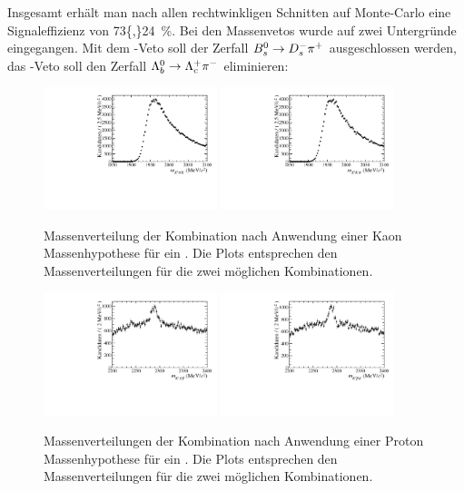 Insgesamt erhält man nach allen rechtwinkligen Schnitten auf Monte-Carlo eine Signaleffizienz von \SI{73{,}24}{\%}. Bei den Massenvetos wurde auf zwei Untergründe eingegangen. Mit dem \Dsm-Veto soll der Zerfall ${{B}^0_{s}}\rightarrow{\ensuremath{{D}^-_{s}}}{\ensuremath{{\pi}^+}}$ ausgeschlossen werden, das \Lc-Veto soll den Zerfall ${{\Lambda}^0_{b}}\rightarrow{\ensuremath{{\Lambda}^+_{c}}}{\ensuremath{{\pi}^-}}$ eliminieren:
\begin{figure}[tbp]
	\centering
		\includegraphics[width=0.45\textwidth]{fig/obsMass_Ds1.pdf}
		\includegraphics[width=0.45\textwidth]{fig/obsMass_Ds2.pdf}
	\caption{Massenverteilung der \Kp\pim\pim Kombination nach Anwendung einer Kaon Massenhypothese für ein \pim. Die Plots entsprechen den Massenverteilungen für die zwei möglichen Kombinationen.}
	\label{fig:dsveto} 
\end{figure} 
\begin{figure}[tbp]
	\centering
		\includegraphics[width=0.45\textwidth]{fig/obsMass_lambda1.pdf}
		\includegraphics[width=0.45\textwidth]{fig/obsMass_lambda2.pdf}
	\caption{Massenverteilungen der \Kp\pim\pim Kombination nach Anwendung einer Proton Massenhypothese für ein \pim. Die Plots entsprechen den Massenverteilungen für die zwei möglichen Kombinationen.}
	\label{fig:lcveto} 
\end{figure}  
